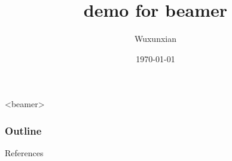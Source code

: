 \documentclass[10pt, mathserif]{beamer}
\title{demo for beamer}
\author{Wuxunxian}
\date{\today}
\begin{document}
\begin{frame}
    \titlepage
\end{frame}
\begin{frame}<beamer>
    \frametitle{Outline}
    \tableofcontents[hideallsubsections]
\end{frame}


%


\begin{frame}[t,allowframebreaks]{References}
  
\end{frame}
\end{document}
